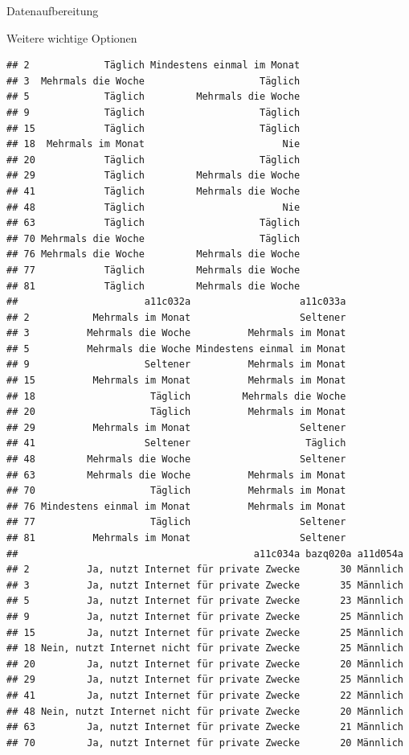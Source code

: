 \documentclass[ignorenonframetext,]{beamer}
\begin{document}
\begin{frame}[fragile]{Datenaufbereitung}
\begin{block}{Weitere wichtige Optionen}
\begin{verbatim}
## 2             Täglich Mindestens einmal im Monat
## 3  Mehrmals die Woche                    Täglich
## 5             Täglich         Mehrmals die Woche
## 9             Täglich                    Täglich
## 15            Täglich                    Täglich
## 18  Mehrmals im Monat                        Nie
## 20            Täglich                    Täglich
## 29            Täglich         Mehrmals die Woche
## 41            Täglich         Mehrmals die Woche
## 48            Täglich                        Nie
## 63            Täglich                    Täglich
## 70 Mehrmals die Woche                    Täglich
## 76 Mehrmals die Woche         Mehrmals die Woche
## 77            Täglich         Mehrmals die Woche
## 81            Täglich         Mehrmals die Woche
##                      a11c032a                   a11c033a
## 2           Mehrmals im Monat                   Seltener
## 3          Mehrmals die Woche          Mehrmals im Monat
## 5          Mehrmals die Woche Mindestens einmal im Monat
## 9                    Seltener          Mehrmals im Monat
## 15          Mehrmals im Monat          Mehrmals im Monat
## 18                    Täglich         Mehrmals die Woche
## 20                    Täglich          Mehrmals im Monat
## 29          Mehrmals im Monat                   Seltener
## 41                   Seltener                    Täglich
## 48         Mehrmals die Woche                   Seltener
## 63         Mehrmals die Woche          Mehrmals im Monat
## 70                    Täglich          Mehrmals im Monat
## 76 Mindestens einmal im Monat          Mehrmals im Monat
## 77                    Täglich                   Seltener
## 81          Mehrmals im Monat                   Seltener
##                                         a11c034a bazq020a a11d054a
## 2          Ja, nutzt Internet für private Zwecke       30 Männlich
## 3          Ja, nutzt Internet für private Zwecke       35 Männlich
## 5          Ja, nutzt Internet für private Zwecke       23 Männlich
## 9          Ja, nutzt Internet für private Zwecke       25 Männlich
## 15         Ja, nutzt Internet für private Zwecke       25 Männlich
## 18 Nein, nutzt Internet nicht für private Zwecke       25 Männlich
## 20         Ja, nutzt Internet für private Zwecke       20 Männlich
## 29         Ja, nutzt Internet für private Zwecke       25 Männlich
## 41         Ja, nutzt Internet für private Zwecke       22 Männlich
## 48 Nein, nutzt Internet nicht für private Zwecke       20 Männlich
## 63         Ja, nutzt Internet für private Zwecke       21 Männlich
## 70         Ja, nutzt Internet für private Zwecke       20 Männlich

\end{verbatim}
\end{block}
\end{frame}
\end{document}
